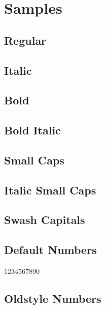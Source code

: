 \documentclass[12pt]{article}
\begin{document}
\pagebreak

\section*{Samples}

\subsection*{Regular}

\lipsum[1]

\subsection*{Italic}
\textit{\lipsum[2]}

\subsection*{Bold}
\textbf{\lipsum[3]}

\subsection*{Bold Italic}
\textbf{\textit{\lipsum[4]}}

\subsection*{Small Caps}
\textsc{\lipsum[5]}

\subsection*{Italic Small Caps}
\textit{\textsc{\lipsum[6]}}

\subsection*{Swash Capitals}

\textit{}

\subsection*{Default Numbers}

1234567890

\subsection*{Oldstyle Numbers}
\end{document}
